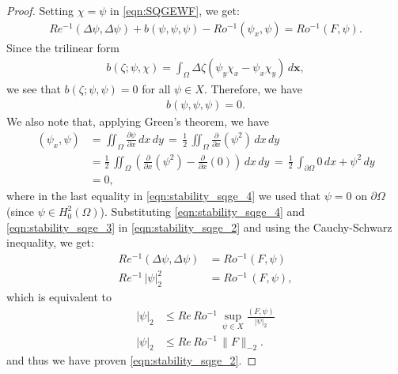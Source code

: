 \begin{proof}
Setting $\chi = \psi$ in \eqref{eqn:SQGEWF}, we get:
\begin{align}
  Re^{-1} (\Delta \psi, \Delta \psi) + b(\psi,\psi, \psi) - Ro^{-1}(\psi_x, \psi)
    = Ro^{-1} (F,\psi) .
\label{eqn:stability_sqge_2}
\end{align}
Since the trilinear form
\begin{align*}
  b(\zeta; \psi, \chi) = \int_{\Omega}\! \Delta \zeta \left(\psi_y \chi_x -
  \psi_x \chi_y\right)\, d\mathbf{x},
\end{align*}
we see that $b(\zeta; \psi, \psi) = 0$ for all $\psi \in X$. Therefore, we have
\begin{align}
  b(\psi,\psi, \psi) = 0 .
  \label{eqn:stability_sqge_3}
\end{align}
We also note that, applying Green's theorem, we have
\begin{align}
  (\psi_x,\psi) &= \iint_{\Omega} \frac{\partial \psi}{\partial x} \, dx \, dy
    \, = \, \frac{1}{2} \, \iint_{\Omega} \frac{\partial}{\partial x} (\psi^2) \, dx \, dy \nonumber \\
  &= \frac{1}{2} \, \iint_{\Omega} \left( \frac{\partial}{\partial x} (\psi^2)
    - \frac{\partial}{\partial x} (0) \right) \, dx \, dy
    \, = \,  \frac{1}{2} \, \int_{\partial \Omega} 0 \, dx + \psi^2 \, dy \nonumber \\
  &= 0 ,
\label{eqn:stability_sqge_4}
\end{align}
where in the last equality in \eqref{eqn:stability_sqge_4} we used that $\psi =
0$ on $\partial \Omega$ (since $\psi \in H_0^2(\Omega)$).  Substituting
\eqref{eqn:stability_sqge_4} and \eqref{eqn:stability_sqge_3} in
\eqref{eqn:stability_sqge_2} and using the Cauchy-Schwarz inequality, we get:
\begin{align}
  Re^{-1} (\Delta \psi, \Delta \psi) &= Ro^{-1} (F,\psi) \nonumber \\
  Re^{-1}\, |\psi|_2^2 &= Ro^{-1}\, (F,\psi),
\end{align}
which is equivalent to
\begin{align}
  |\psi|_2 &\le Re\, Ro^{-1}\,\sup_{\psi \in X} \frac{(F,\psi)}{|\psi|_2} \nonumber \\
  |\psi|_2 &\le Re\, Ro^{-1}\, \|F\|_{-2}.
  \label{eqn:stability_sqge_5}
\end{align}
and thus we have proven \eqref{eqn:stability_sqge_2}.
\end{proof}
